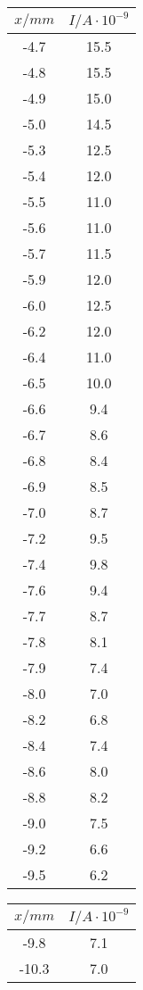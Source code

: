 \begin{table}
\begin{minipage}{0.25\textwidth}
\begin{tabular}{c|c}
		\toprule
		{$x / mm$} & {$I / A\cdot10^{-9}$} \\
		\hline
        \midrule
        -4.7 &15.5\\
        -4.8 &15.5\\
        -4.9 &15.0\\
        -5.0 &14.5\\
        -5.3 &12.5\\
        -5.4 &12.0\\
        -5.5 &11.0\\
        -5.6 &11.0\\
        -5.7 &11.5\\
        -5.9 &12.0\\
        -6.0 &12.5\\
        -6.2 &12.0\\
        -6.4 &11.0\\
        -6.5 &10.0\\
        -6.6 &9.4\\
        -6.7 &8.6\\
        -6.8 &8.4\\
        -6.9 &8.5\\
        -7.0 &8.7\\
        -7.2 &9.5\\
        -7.4 &9.8\\
        -7.6 &9.4\\
        -7.7 &8.7\\
        -7.8 &8.1\\
        -7.9 &7.4\\
        -8.0 &7.0\\
        -8.2 &6.8\\
        -8.4 &7.4\\
        -8.6 &8.0\\
        -8.8 &8.2\\
        -9.0 &7.5\\
        -9.2 &6.6\\
        -9.5 &6.2\\
		\bottomrule 
	\end{tabular}
\end{minipage}
\begin{minipage}{0.25\textwidth}
    \centering
	\label{tab:b}
	\begin{tabular}{c|c}
		\toprule
		{$x / mm$} & {$I / A\cdot10^{-9}$} \\
		\hline
        \midrule
        -9.8 &7.1\\
        -10.3 &7.0\\

\end{tabular}
\end{minipage}
\end{table}
